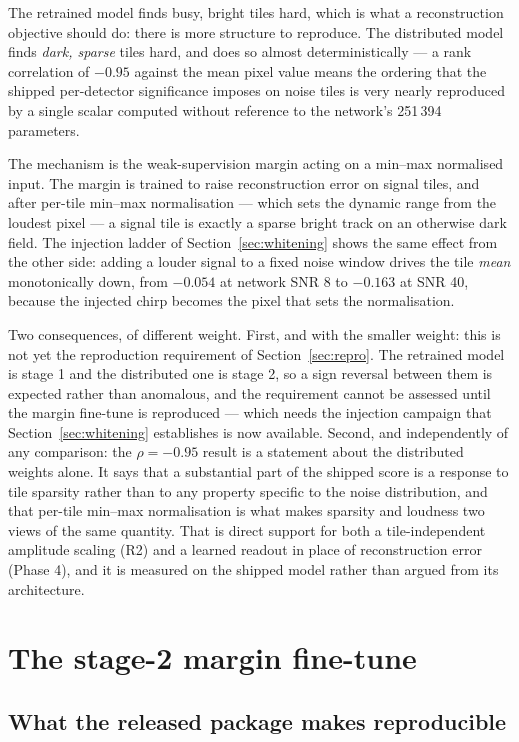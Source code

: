 \documentclass[11pt]{article}
\begin{document}
The retrained model finds busy, bright tiles hard, which is what a reconstruction
objective should do: there is more structure to reproduce. The distributed model finds
\emph{dark, sparse} tiles hard, and does so almost deterministically --- a rank
correlation of $-0.95$ against the mean pixel value means the ordering that the shipped
per-detector significance imposes on noise tiles is very nearly reproduced by a single
scalar computed without reference to the network's 251\,394 parameters.

The mechanism is the weak-supervision margin acting on a min--max normalised input. The
margin is trained to raise reconstruction error on signal tiles, and after per-tile
min--max normalisation --- which sets the dynamic range from the loudest pixel --- a
signal tile is exactly a sparse bright track on an otherwise dark field. The injection
ladder of Section~\ref{sec:whitening} shows the same effect from the other side: adding
a louder signal to a fixed noise window drives the tile \emph{mean} monotonically down,
from $-0.054$ at network SNR 8 to $-0.163$ at SNR 40, because the injected chirp becomes
the pixel that sets the normalisation.

Two consequences, of different weight. First, and with the smaller weight: this is not
yet the reproduction requirement of Section~\ref{sec:repro}. The retrained model is
stage 1 and the distributed one is stage 2, so a sign reversal between them is expected
rather than anomalous, and the requirement cannot be assessed until the margin fine-tune
is reproduced --- which needs the injection campaign that
Section~\ref{sec:whitening} establishes is now available. Second, and independently of
any comparison: the $\rho = -0.95$ result is a statement about the distributed weights
alone. It says that a substantial part of the shipped score is a response to tile
sparsity rather than to any property specific to the noise distribution, and that
per-tile min--max normalisation is what makes sparsity and loudness two views of the
same quantity. That is direct support for both a tile-independent amplitude scaling
(R2) and a learned readout in place of reconstruction error (Phase 4), and it is
measured on the shipped model rather than argued from its architecture.

\section{The stage-2 margin fine-tune}
\label{sec:stage2}

\subsection*{What the released package makes reproducible}
\end{document}
